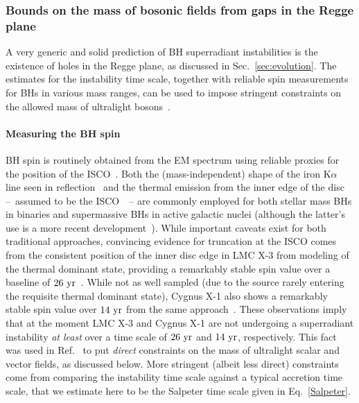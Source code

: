 \documentclass[11pt]{article}
\numberwithin{equation}{section} %
\begin{document}
\subsubsection{Bounds on the mass of bosonic fields from gaps in the Regge plane}\label{sec:bounds_mass_regge}

A very generic and solid prediction of BH superradiant instabilities is the existence of holes in the Regge plane, as discussed in Sec.~\ref{sec:evolution}. 
The estimates for the instability time scale, together with reliable spin measurements for BHs in various mass ranges,
can be used to impose stringent constraints on the allowed mass
of ultralight 
bosons~\cite{Arvanitaki:2009fg,Arvanitaki:2010sy,Pani:2012vp,Brito:2013wya,Arvanitaki:2014wva,Arvanitaki:2016qwi,
Baryakhtar:2017ngi,Brito:2017zvb,Stott:2018opm,Cardoso:2018tly,Davoudiasl:2019nlo,Ng:2020ruv}. 
%

\paragraph{Measuring the BH spin}
%
BH spin is routinely obtained from the EM spectrum using reliable proxies for the position of the ISCO~\cite{Middleton:2014sma}. Both the (mass-independent) shape of the iron K${\alpha}$ line seen in reflection~\cite{Fabian:2000nu} and the thermal emission from the inner edge of the disc~\cite{Zhang:1997dy} --~assumed to be the ISCO~\cite{Shafee:2007sa,Penna:2010hu}~-- are commonly employed for both stellar mass BHs in binaries and supermassive BHs in active galactic nuclei (although the latter's use is a more recent development~\cite{Done:2011at}). While important caveats exist for both traditional approaches, convincing evidence for truncation at the ISCO comes from the consistent position of the inner disc edge in LMC X-3 from modeling of the thermal dominant state, providing a remarkably stable spin value over a baseline of $26~{\rm yr}$~\cite{Steiner:2010kd}. While not as well sampled (due to the source rarely entering the requisite thermal dominant state), Cygnus X-1 also shows a remarkably stable spin value over $14~{\rm yr}$ from the same approach~\cite{Gou:2009ks}.
%
These observations imply that at the moment LMC X-3 and Cygnus X-1 are not undergoing a superradiant instability \emph{at least} over a time scale of $26~{\rm yr}$ and $14~{\rm yr}$, respectively. This fact was used in Ref.~\cite{Cardoso:2018tly} to put \emph{direct} constraints on the mass of ultralight scalar and vector fields, as discussed below.
%
More stringent (albeit less direct) constraints come from comparing the instability time scale against a typical accretion time scale, that we estimate here to be the Salpeter time scale given in Eq.~\eqref{Salpeter}.
\end{document}
